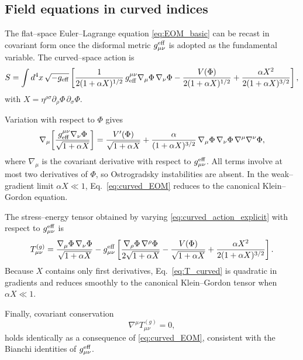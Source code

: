 \documentclass{article}
\begin{document}
\subsection{Field equations in curved indices}

The flat–space Euler–Lagrange equation \eqref{eq:EOM_basic} can be recast in covariant form once the disformal metric $g^{\rm eff}_{\mu\nu}$ is adopted as the fundamental variable. The curved–space action is
\begin{equation}
S = \int d^4x\,\sqrt{-g_{\rm eff}} \left[
\frac{1}{2(1+\alpha X)^{1/2}}\,g_{\rm eff}^{\mu\nu}\nabla_\mu \Phi \,\nabla_\nu \Phi
- \frac{V(\Phi)}{2(1+\alpha X)^{1/2}}
+ \frac{\alpha X^2}{2(1+\alpha X)^{3/2}}
\right],
\label{eq:curved_action_explicit}
\end{equation}
with $X=\eta^{\rho\sigma}\partial_\rho\Phi\,\partial_\sigma\Phi$.

Variation with respect to $\Phi$ gives
\begin{equation}
\nabla_\mu \!\left[ 
\frac{g_{\rm eff}^{\mu\nu}\nabla_\nu \Phi}{\sqrt{1+\alpha X}}
\right]
= \frac{V'(\Phi)}{\sqrt{1+\alpha X}}
+ \frac{\alpha}{(1+\alpha X)^{3/2}}
\,\nabla_\mu \Phi \,\nabla_\nu \Phi \,\nabla^\mu \nabla^\nu \Phi ,
\label{eq:curved_EOM}
\end{equation}
where $\nabla_\mu$ is the covariant derivative with respect to $g^{\rm eff}_{\mu\nu}$. All terms involve at most two derivatives of $\Phi$, so Ostrogradsky instabilities are absent. In the weak–gradient limit $\alpha X\ll1$, Eq.~\eqref{eq:curved_EOM} reduces to the canonical Klein–Gordon equation.

The stress–energy tensor obtained by varying \eqref{eq:curved_action_explicit} with respect to $g^{\rm eff}_{\mu\nu}$ is
\begin{equation}
T^{(g)}_{\mu\nu} =
\frac{\nabla_\mu \Phi \,\nabla_\nu \Phi}{\sqrt{1+\alpha X}}
- g^{\rm eff}_{\mu\nu}\left[
\frac{\nabla_\rho \Phi \,\nabla^\rho \Phi}{2\sqrt{1+\alpha X}}
- \frac{V(\Phi)}{\sqrt{1+\alpha X}}
+ \frac{\alpha X^2}{2(1+\alpha X)^{3/2}}
\right].
\label{eq:T_curved}
\end{equation}
Because $X$ contains only first derivatives, Eq.~\eqref{eq:T_curved} is quadratic in gradients and reduces smoothly to the canonical Klein–Gordon tensor when $\alpha X\ll1$.

Finally, covariant conservation
\begin{equation}
\nabla^\mu T^{(g)}_{\mu\nu}=0 ,
\label{eq:T_conservation}
\end{equation}
holds identically as a consequence of \eqref{eq:curved_EOM}, consistent with the Bianchi identities of $g^{\rm eff}_{\mu\nu}$.
\end{document}
